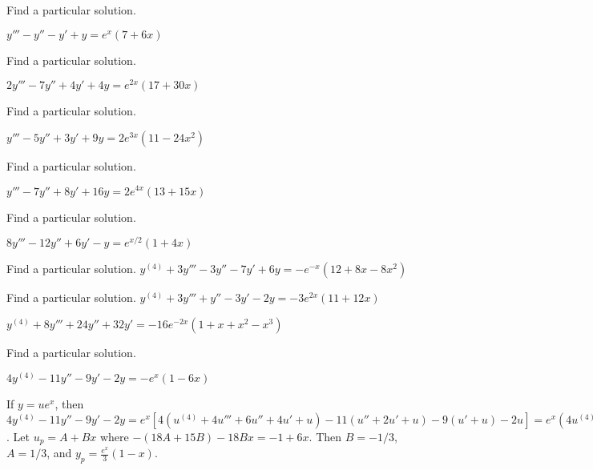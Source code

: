 \documentclass{ximera}
\begin{document}
\begin{problem}\label{exer:9.3.8}   Find a particular solution.  

$y'''-y''-y'+y=e^x(7+6x)$
\end{problem}

\begin{problem}\label{exer:9.3.9}   Find a particular solution. 

$2y'''-7y''+4y'+4y=e^{2x}(17+30x)$
\end{problem}

\begin{problem}\label{exer:9.3.10}   Find a particular solution.

$y'''-5y''+3y'+9y=2e^{3x}(11-24x^2)$
\end{problem}

\begin{problem}\label{exer:9.3.11}   Find a particular solution.

$y'''-7y''+8y'+16y=2e^{4x}(13+15x)$
\end{problem}

\begin{problem}\label{exer:9.3.12}   Find a particular solution.

$8y'''-12y''+6y'-y=e^{x/2}(1+4x)$
\end{problem}

\begin{problem}\label{exer:9.3.13}   Find a particular solution.   $y^{(4)}+3y'''-3y''-7y'+6y=-e^{-x}(12+8x-8x^2)$
\end{problem}

\begin{problem}\label{exer:9.3.14}   Find a particular solution.   $y^{(4)}+3y'''+y''-3y'-2y=-3e^{2x}(11+12x)$
\end{problem}

\begin{problem}\label{exer:9.3.15}
$y^{(4)}+8y'''+24y''+32y'=-16e^{-2x}(1+x+x^2-x^3)$
\end{problem}

\begin{problem}\label{exer:9.3.16}   Find a particular solution.

$4y^{(4)}-11y''-9y'-2y=-e^x(1-6x)$

\begin{solution}
If $y=ue^x$, then $4y^{(4)}-11y''-9y'-2y=e^x[
4(u^{(4)}+4u'''+6u''+4u'+u) -11(u''+2u'+u) -9(u'+u) -2u]
=e^x(4u^{(4)}+16u'''+13u''-15u'-18u)$. Let $u_p=A+Bx$ where
$-(18A+15B)-18Bx=-1+6x$. Then $B=-1/3$, $A=1/3$, and
$y_p=\frac{e^x}{3}(1-x)$.
\end{solution}
\end{problem}
\end{document}
